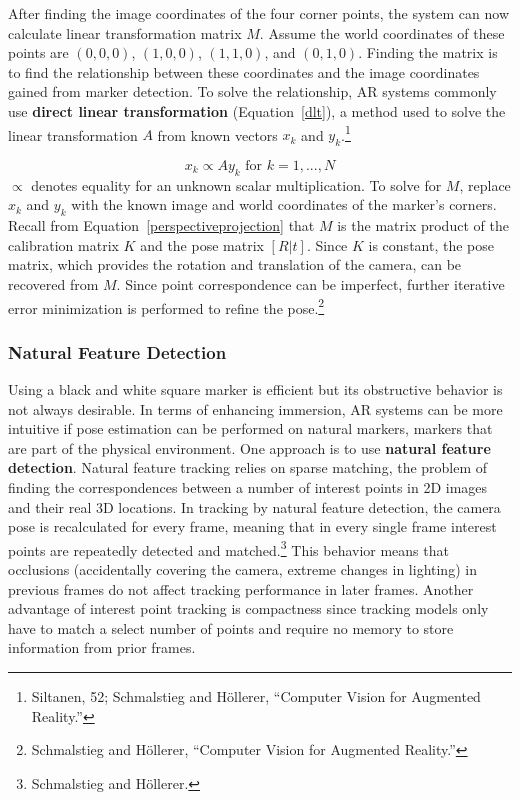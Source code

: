 After finding the image coordinates of the four corner points, the system can now calculate linear transformation matrix $M$. Assume the world coordinates of these points are $(0, 0, 0)$, $(1, 0, 0)$, $(1, 1, 0)$, and $(0, 1, 0)$. Finding the matrix is to find the relationship between these coordinates and the image coordinates gained from marker detection. To solve the relationship, AR systems commonly use \textbf{direct linear transformation} (Equation~\ref{dlt}), a method used to solve the linear transformation $A$ from known vectors $x_k$ and $y_k$.\footnote{Siltanen, 52; Schmalstieg and Höllerer, “Computer Vision for Augmented Reality.”}

\begin{equation}[Direct linear transformation]\label{dlt}
x_k \propto Ay_k \text{ for } k = 1,...,N
\end{equation}
$\propto$ denotes equality for an unknown scalar multiplication. To solve for $M$, replace $x_k$ and $y_k$ with the known image and world coordinates of the marker's corners. Recall from Equation~\ref{perspectiveprojection} that $M$ is the matrix product of the calibration matrix $K$ and the pose matrix $[R|t]$. Since $K$ is constant, the pose matrix, which provides the rotation and translation of the camera, can be recovered from $M$. Since point correspondence can be imperfect, further iterative error minimization is performed to refine the pose.\footnote{Schmalstieg and Höllerer, “Computer Vision for Augmented Reality.”}

\subsubsection{Natural Feature Detection}
Using a black and white square marker is efficient but its obstructive behavior is not always desirable. In terms of enhancing immersion, AR systems can be more intuitive if pose estimation can be performed on natural markers, markers that are part of the physical environment. One approach is to use \textbf{natural feature detection}. Natural feature tracking relies on sparse matching, the problem of finding the correspondences between a number of interest points in 2D images and their real 3D locations. In tracking by natural feature detection, the camera pose is recalculated for every frame, meaning that in every single frame interest points are repeatedly detected and matched.\footnote{Schmalstieg and Höllerer.} This behavior means that occlusions (accidentally covering the camera, extreme changes in lighting) in previous frames do not affect tracking performance in later frames. Another advantage of interest point tracking is compactness since tracking models only have to match a select number of points and require no memory to store information from prior frames.

